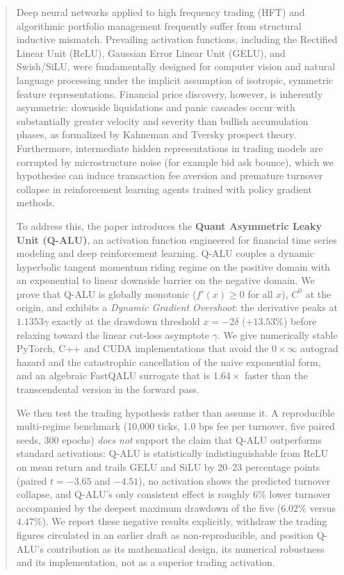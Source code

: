 \documentclass[conference]{IEEEtran}
\begin{document}
\begin{abstract}
Deep neural networks applied to high frequency trading (HFT) and algorithmic portfolio management frequently suffer from structural inductive mismatch. Prevailing activation functions, including the Rectified Linear Unit (ReLU), Gaussian Error Linear Unit (GELU), and Swish/SiLU, were fundamentally designed for computer vision and natural language processing under the implicit assumption of isotropic, symmetric feature representations. Financial price discovery, however, is inherently asymmetric: downside liquidations and panic cascades occur with substantially greater velocity and severity than bullish accumulation phases, as formalized by Kahneman and Tversky prospect theory. Furthermore, intermediate hidden representations in trading models are corrupted by microstructure noise (for example bid ask bounce), which we hypothesise can induce transaction fee aversion and premature turnover collapse in reinforcement learning agents trained with policy gradient methods.

To address this, the paper introduces the \textbf{Quant Asymmetric Leaky Unit (Q-ALU)}, an activation function engineered for financial time series modeling and deep reinforcement learning. Q-ALU couples a dynamic hyperbolic tangent momentum riding regime on the positive domain with an exponential to linear downside barrier on the negative domain. We prove that Q-ALU is globally monotonic ($f'(x) \ge 0$ for all $x$), $C^0$ at the origin, and exhibits a \textit{Dynamic Gradient Overshoot}: the derivative peaks at $1.1353\gamma$ exactly at the drawdown threshold $x = -2\delta$ ($+13.53\%$) before relaxing toward the linear cut-loss asymptote $\gamma$. We give numerically stable PyTorch, C++ and CUDA implementations that avoid the $0 \times \infty$ autograd hazard and the catastrophic cancellation of the naive exponential form, and an algebraic FastQALU surrogate that is $1.64\times$ faster than the transcendental version in the forward pass.

We then test the trading hypothesis rather than assume it. A reproducible multi-regime benchmark (10,000 ticks, 1.0 bps fee per turnover, five paired seeds, 300 epochs) \emph{does not} support the claim that Q-ALU outperforms standard activations: Q-ALU is statistically indistinguishable from ReLU on mean return and trails GELU and SiLU by 20--23 percentage points (paired $t = -3.65$ and $-4.51$), no activation shows the predicted turnover collapse, and Q-ALU's only consistent effect is roughly $6\%$ lower turnover accompanied by the deepest maximum drawdown of the five ($6.02\%$ versus $4.47\%$). We report these negative results explicitly, withdraw the trading figures circulated in an earlier draft as non-reproducible, and position Q-ALU's contribution as its mathematical design, its numerical robustness and its implementation, not as a superior trading activation.
\end{abstract}
\end{document}
